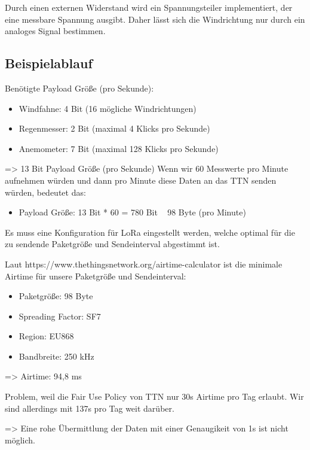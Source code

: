 \documentclass[12pt]{article}
\begin{document}
        Durch einen externen Widerstand wird ein Spannungsteiler implementiert, der eine messbare Spannung ausgibt.
        Daher lässt sich die Windrichtung nur durch ein analoges Signal bestimmen.

    \subsection{Beispielablauf}

      Benötigte Payload Größe (pro Sekunde):

      \begin{itemize}
        \item Windfahne: 4 Bit (16 mögliche Windrichtungen)
        \item Regenmesser: 2 Bit (maximal 4 Klicks pro Sekunde)
        \item Anemometer: 7 Bit (maximal 128 Klicks pro Sekunde)
      \end{itemize}

      => 13 Bit Payload Größe (pro Sekunde)
      Wenn wir 60 Messwerte pro Minute aufnehmen würden und dann pro Minute diese Daten an das TTN senden würden, bedeutet das:

      \begin{itemize}
        \item Payload Größe: 13 Bit * 60 = 780 Bit ~ 98 Byte (pro Minute)
      \end{itemize}

      Es muss eine Konfiguration für LoRa eingestellt werden, welche optimal für die zu sendende Paketgröße und Sendeinterval abgestimmt ist.

      Laut https://www.thethingsnetwork.org/airtime-calculator ist die minimale Airtime für unsere Paketgröße und Sendeinterval:

      \begin{itemize}
        \item Paketgröße: 98 Byte
        \item Spreading Factor: SF7
        \item Region: EU868
        \item Bandbreite: 250 kHz
      \end{itemize}

      => Airtime: 94,8 ms

      Problem, weil die Fair Use Policy von TTN nur 30s Airtime pro Tag erlaubt. Wir sind allerdings mit 137s pro Tag weit darüber.

      => Eine rohe Übermittlung der Daten mit einer Genaugikeit von 1s ist nicht möglich.
\end{document}
